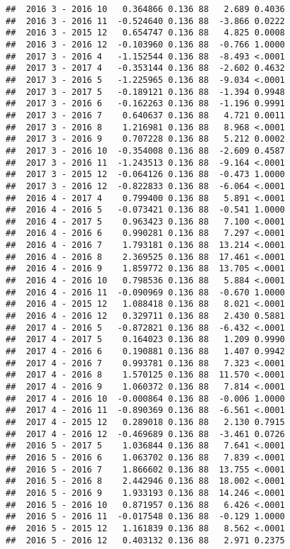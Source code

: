 \documentclass[
]{article}
\begin{document}
\begin{verbatim}
##  2016 3 - 2016 10   0.364866 0.136 88   2.689 0.4036 
##  2016 3 - 2016 11  -0.524640 0.136 88  -3.866 0.0222 
##  2016 3 - 2015 12   0.654747 0.136 88   4.825 0.0008 
##  2016 3 - 2016 12  -0.103960 0.136 88  -0.766 1.0000 
##  2017 3 - 2016 4   -1.152544 0.136 88  -8.493 <.0001 
##  2017 3 - 2017 4   -0.353144 0.136 88  -2.602 0.4632 
##  2017 3 - 2016 5   -1.225965 0.136 88  -9.034 <.0001 
##  2017 3 - 2017 5   -0.189121 0.136 88  -1.394 0.9948 
##  2017 3 - 2016 6   -0.162263 0.136 88  -1.196 0.9991 
##  2017 3 - 2016 7    0.640637 0.136 88   4.721 0.0011 
##  2017 3 - 2016 8    1.216981 0.136 88   8.968 <.0001 
##  2017 3 - 2016 9    0.707228 0.136 88   5.212 0.0002 
##  2017 3 - 2016 10  -0.354008 0.136 88  -2.609 0.4587 
##  2017 3 - 2016 11  -1.243513 0.136 88  -9.164 <.0001 
##  2017 3 - 2015 12  -0.064126 0.136 88  -0.473 1.0000 
##  2017 3 - 2016 12  -0.822833 0.136 88  -6.064 <.0001 
##  2016 4 - 2017 4    0.799400 0.136 88   5.891 <.0001 
##  2016 4 - 2016 5   -0.073421 0.136 88  -0.541 1.0000 
##  2016 4 - 2017 5    0.963423 0.136 88   7.100 <.0001 
##  2016 4 - 2016 6    0.990281 0.136 88   7.297 <.0001 
##  2016 4 - 2016 7    1.793181 0.136 88  13.214 <.0001 
##  2016 4 - 2016 8    2.369525 0.136 88  17.461 <.0001 
##  2016 4 - 2016 9    1.859772 0.136 88  13.705 <.0001 
##  2016 4 - 2016 10   0.798536 0.136 88   5.884 <.0001 
##  2016 4 - 2016 11  -0.090969 0.136 88  -0.670 1.0000 
##  2016 4 - 2015 12   1.088418 0.136 88   8.021 <.0001 
##  2016 4 - 2016 12   0.329711 0.136 88   2.430 0.5881 
##  2017 4 - 2016 5   -0.872821 0.136 88  -6.432 <.0001 
##  2017 4 - 2017 5    0.164023 0.136 88   1.209 0.9990 
##  2017 4 - 2016 6    0.190881 0.136 88   1.407 0.9942 
##  2017 4 - 2016 7    0.993781 0.136 88   7.323 <.0001 
##  2017 4 - 2016 8    1.570125 0.136 88  11.570 <.0001 
##  2017 4 - 2016 9    1.060372 0.136 88   7.814 <.0001 
##  2017 4 - 2016 10  -0.000864 0.136 88  -0.006 1.0000 
##  2017 4 - 2016 11  -0.890369 0.136 88  -6.561 <.0001 
##  2017 4 - 2015 12   0.289018 0.136 88   2.130 0.7915 
##  2017 4 - 2016 12  -0.469689 0.136 88  -3.461 0.0726 
##  2016 5 - 2017 5    1.036844 0.136 88   7.641 <.0001 
##  2016 5 - 2016 6    1.063702 0.136 88   7.839 <.0001 
##  2016 5 - 2016 7    1.866602 0.136 88  13.755 <.0001 
##  2016 5 - 2016 8    2.442946 0.136 88  18.002 <.0001 
##  2016 5 - 2016 9    1.933193 0.136 88  14.246 <.0001 
##  2016 5 - 2016 10   0.871957 0.136 88   6.426 <.0001 
##  2016 5 - 2016 11  -0.017548 0.136 88  -0.129 1.0000 
##  2016 5 - 2015 12   1.161839 0.136 88   8.562 <.0001 
##  2016 5 - 2016 12   0.403132 0.136 88   2.971 0.2375 

\end{verbatim}
\end{document}
